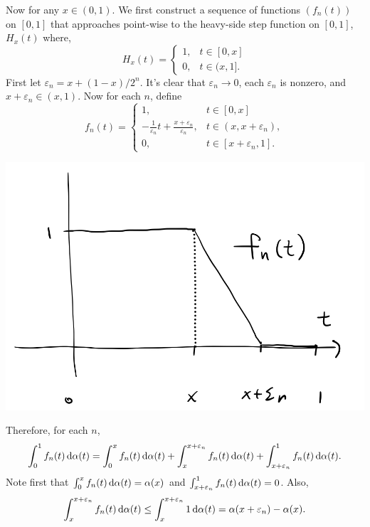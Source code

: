 \documentclass[12pt]{article}
\begin{document}
\begin{fproof}[3(b)]
Now for any \(x \in (0,1)\).
We first construct a sequence of functions \((f_n(t))\) on \([0,1]\) that approaches point-wise to the heavy-side step function on \([0,1]\), \(H_x(t)\) where,
\[
H_x(t) = 
\begin{cases}
    1, & t \in [0,x]\\
    0, & t \in (x,1].
\end{cases}
\]
First let \(\varepsilon_n = x + (1-x)/2^n\).
It's clear that \(\varepsilon_n \to 0\), each \(\varepsilon_n\) is nonzero,  and \(x + \varepsilon_n \in (x,1)\).
Now for each \(n\), define 
\[
f_n(t) = 
\begin{cases}
    1, & t \in [0,x]\\
    -\frac{1}{\varepsilon_n} t + \frac{x + \varepsilon_n}{\varepsilon_n}, & t \in (x, x + \varepsilon_n),\\
    0, & t\in [x + \varepsilon_n, 1].
\end{cases}
\]
\begin{center}
    \includegraphics[scale=0.2]{Asst6.3b.jpeg}
\end{center}
Therefore, for each \(n\),
\begin{align*}
    \int_{0}^{1}f_n(t) \mathop{}\!\mathrm{d}\alpha(t) = \int_{0}^{x} f_n(t) \mathop{}\!\mathrm{d}\alpha(t) + \int_{x}^{x+\varepsilon_n} f_n(t) \mathop{}\!\mathrm{d}\alpha(t) + \int_{x+\varepsilon_n}^{1} f_n(t) \mathop{}\!\mathrm{d}\alpha(t).
\end{align*}
Note first that \(\int_{0}^{x} f_n(t) \mathop{}\!\mathrm{d}\alpha(t) = \alpha(x)\) and \(\int_{x+\varepsilon_n}^{1} f_n(t) \mathop{}\!\mathrm{d}\alpha(t) = 0\).
Also,
\begin{align*}
    \int_{x}^{x+\varepsilon_n} f_n(t) \mathop{}\!\mathrm{d}\alpha(t) \leq \int_{x}^{x+\varepsilon_n} 1 \mathop{}\!\mathrm{d}\alpha(t) = \alpha(x + \varepsilon_n) - \alpha(x).
\end{align*}

\end{fproof}
\end{document}

